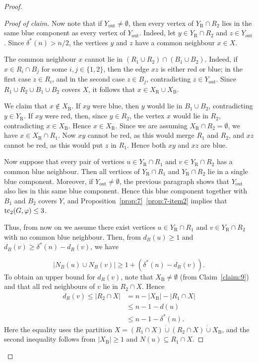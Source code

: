 \documentclass[12pt,reqno,a4paper]{amsart}
\newenvironment{claimproof}[1][Proof of claim]{\begin{proof}[#1]\renewcommand{\qedsymbol}{$\scriptstyle\square$}}{\end{proof}}
\def\tc{\mathop{\text{\rm tc}}\nolimits}
\newcommand{\out}{\mathrm{out}}
\newcommand{\R}{\mathrm{R}}
\newcommand{\B}{\mathrm{B}}
\begin{document}
\begin{proof}
\begin{claimproof}
Now note that if $Y_{\out}\neq\emptyset$, then every
vertex of $Y_{\R}\cap R_2$ lies in the same blue component as every vertex of
$Y_{\out}$. Indeed, let $y\in Y_{\R}\cap R_2$ and $z\in Y_{\out}$. Since
$\delta^*(n)>n/2$, the vertices $y$ and $z$ have a common neighbour $x\in X$.

The common neighbour $x$ cannot lie in $(R_1\cup R_2)\cap(B_1\cup B_2)$.
Indeed, if $x\in R_i\cap B_j$ for some $i,j\in\{1,2\}$, then the edge $xz$ is
either red or blue; in the first case $z\in R_i$, and in the second case $z\in
B_j$, contradicting $z\in Y_{\out}$. Since $R_1\cup R_2\cup B_1\cup B_2$ covers
$X$, it follows that $x\in X_{\R}\cup X_{\B}$.

We claim that $x\notin X_{\B}$. If $xy$ were blue, then $y$ would lie in
$B_1\cup B_2$, contradicting $y\in Y_{\R}$. If $xy$ were red, then, since $y\in
R_2$, the vertex $x$ would lie in $R_2$, contradicting $x\in X_{\B}$. Hence
$x\in X_{\R}$. Since we are assuming $X_{\R}\cap R_2=\emptyset$, we have $x\in
X_{\R}\cap R_1$. Now $xy$ cannot be red, as this would merge $R_1$ and $R_2$,
and $xz$ cannot be red, as this would put $z$ in $R_1$. Hence both $xy$ and $xz$
are blue.

Now suppose that every pair of vertices $u\in Y_{\R}\cap R_1$ and $v\in
Y_{\R}\cap R_2$ has a common blue neighbour. Then all vertices of $Y_{\R}\cap
R_1$ and $Y_{\R}\cap R_2$ lie in a single blue component. Moreover, if
$Y_{\out}\neq\emptyset$, the previous paragraph shows that $Y_{\out}$ also lies
in this same blue component. Hence this blue component together with $B_1$ and
$B_2$ covers $Y$, and Proposition~\ref{prop:7}~\ref{prop:7-item2} implies that
$\tc_2(G,\varphi)\le 3$.

Thus, from now on we assume there exist vertices $u\in Y_{\R}\cap R_1$ and
$v\in Y_{\R}\cap R_2$ with no common blue neighbour. Then, from
$d_B(u)\geq 1$ and $d_B(v)\geq \delta^*(n)-d_R(v)$, we have

\begin{equation}
\label{claim:10-eq1}
|N_B(u) \cup N_B(v)| \ge 1 + (\delta^*(n) - d_R(v)).
\end{equation}
To obtain an upper bound for $d_R(v)$, note that $X_{\B} \neq \emptyset$ (from
Claim~\ref{claim:9}) and that all red neighbours of $v$ lie in $R_2\cap X$. Hence
\begin{align*}
d_R(v) \le |R_2 \cap X| &= n - |X_{\B}| - |R_1 \cap X|\\
& \le n - 1 - d(u)\\
& \le n - 1 - \delta^*(n).
\end{align*}
Here the equality uses the partition
$X=(R_1\cap X)\mathbin{\dot\cup}(R_2\cap X)\mathbin{\dot\cup}X_{\B}$, and the
second inequality follows from $|X_{\B}|\ge1$ and $N(u)\subseteq R_1\cap X$.


\end{claimproof}
\end{proof}
\end{document}
